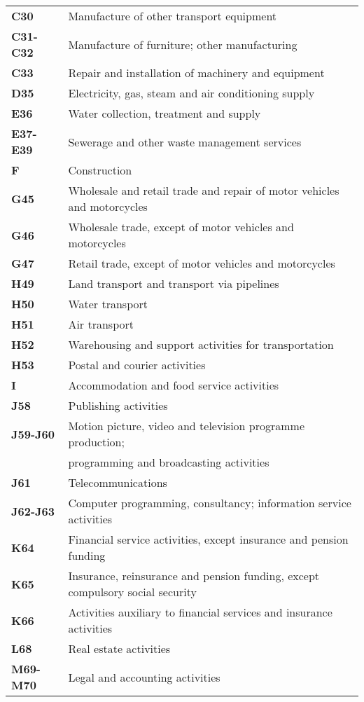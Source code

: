 \documentclass[11pt,a4paper]{article} %
\begin{document}
\begin{table}[H]
\begin{tabular}{ll}
\textbf{C30} &{Manufacture of other transport equipment}\\
\textbf{C31-C32} &{Manufacture of furniture; other manufacturing}\\
\textbf{C33} &{Repair and installation of machinery and equipment}\\
\textbf{D35} &{Electricity, gas, steam and air conditioning supply}\\
\textbf{E36} &{Water collection, treatment and supply}\\
\textbf{E37-E39} &{Sewerage and other waste management services}\\
\textbf{F} &{Construction}\\
\textbf{G45} &{Wholesale and retail trade and repair of motor vehicles and motorcycles}\\
\textbf{G46} &{Wholesale trade, except of motor vehicles and motorcycles}\\
\textbf{G47} &{Retail trade, except of motor vehicles and motorcycles}\\
\textbf{H49} &{Land transport and transport via pipelines}\\
\textbf{H50} &{Water transport}\\
\textbf{H51} &{Air transport}\\
\textbf{H52} &{Warehousing and support activities for transportation}\\
\textbf{H53} &{Postal and courier activities}\\
\textbf{I} &{Accommodation and food service activities}\\
\textbf{J58} &{Publishing activities}\\
\textbf{J59-J60} &{Motion picture, video and television programme production;}\\
&{programming and broadcasting activities}\\
\textbf{J61} &{Telecommunications}\\
\textbf{J62-J63} &{Computer programming, consultancy; information service activities}\\
\textbf{K64} &{Financial service activities, except insurance and pension funding}\\
\textbf{K65} &{Insurance, reinsurance and pension funding, except compulsory social security}\\
\textbf{K66} &{Activities auxiliary to financial services and insurance activities}\\
\textbf{L68} &{Real estate activities}\\
\textbf{M69-M70} &{Legal and accounting activities}\\

\end{tabular}
\end{table}
\end{document}
